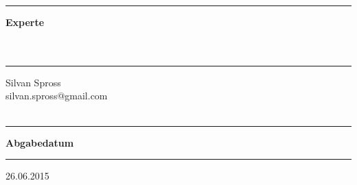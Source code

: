 \begin{titlepage}
\begin{minipage}[b]{0.91\textwidth}
	\begin{minipage}[b]{0.27\textwidth}
	\hrule\vskip 0.5cm
		\textbf{Experte}\\
		\\
		\\
	\end{minipage}
	\begin{minipage}[b]{0.03\textwidth}
	\hskip 0.5cm
	\end{minipage}
	\begin{minipage}[b]{0.7\textwidth}
	\hrule\vskip 0.5cm
		Silvan Spross\\
		silvan.spross@gmail.com\\
		\\
	\end{minipage}
	
	\begin{minipage}[b]{0.27\textwidth}
	\hrule\vskip 0.5cm
		\textbf{Abgabedatum}
	\end{minipage}
	\begin{minipage}[b]{0.03\textwidth}
	\hskip 0.5cm
	\end{minipage}
	\begin{minipage}[b]{0.7\textwidth}
	\hrule\vskip 0.5cm
		26.06.2015
	\end{minipage}

\end{minipage}
\vskip 0.5cm


\end{titlepage}
